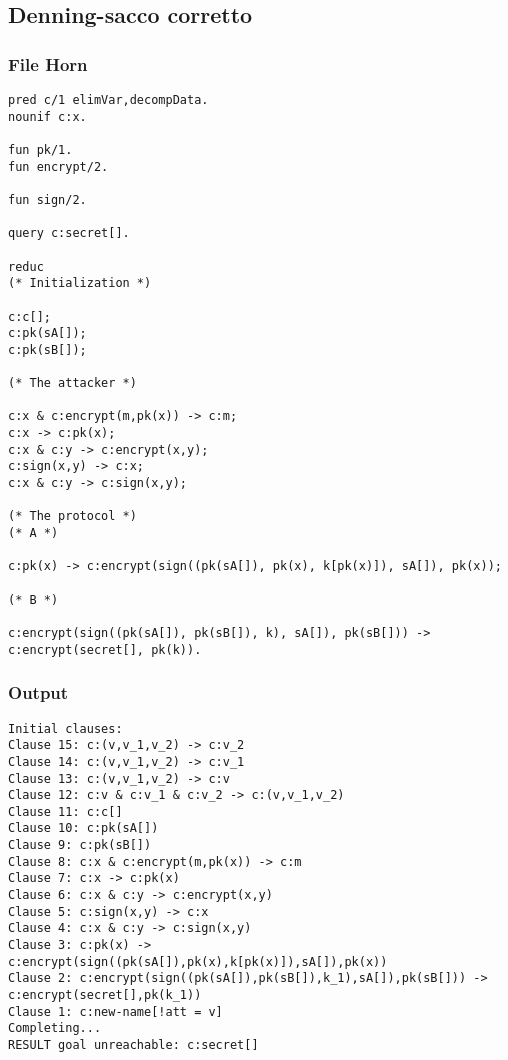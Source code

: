 \documentclass[11pt]{article}
\begin{document}
\subsection{Denning-sacco corretto}
\label{sec:orgd4e2c4a}
\subsubsection{File Horn}
\label{sec:org86ecd58}
\begin{verbatim}
pred c/1 elimVar,decompData.
nounif c:x.

fun pk/1.
fun encrypt/2.

fun sign/2.

query c:secret[].

reduc
(* Initialization *)

c:c[];
c:pk(sA[]);
c:pk(sB[]);

(* The attacker *)

c:x & c:encrypt(m,pk(x)) -> c:m;
c:x -> c:pk(x);
c:x & c:y -> c:encrypt(x,y);
c:sign(x,y) -> c:x;
c:x & c:y -> c:sign(x,y);

(* The protocol *)
(* A *)

c:pk(x) -> c:encrypt(sign((pk(sA[]), pk(x), k[pk(x)]), sA[]), pk(x));

(* B *)

c:encrypt(sign((pk(sA[]), pk(sB[]), k), sA[]), pk(sB[])) -> c:encrypt(secret[], pk(k)).
\end{verbatim}
\subsubsection{Output}
\label{sec:orga1a464d}
\begin{verbatim}
Initial clauses:
Clause 15: c:(v,v_1,v_2) -> c:v_2
Clause 14: c:(v,v_1,v_2) -> c:v_1
Clause 13: c:(v,v_1,v_2) -> c:v
Clause 12: c:v & c:v_1 & c:v_2 -> c:(v,v_1,v_2)
Clause 11: c:c[]
Clause 10: c:pk(sA[])
Clause 9: c:pk(sB[])
Clause 8: c:x & c:encrypt(m,pk(x)) -> c:m
Clause 7: c:x -> c:pk(x)
Clause 6: c:x & c:y -> c:encrypt(x,y)
Clause 5: c:sign(x,y) -> c:x
Clause 4: c:x & c:y -> c:sign(x,y)
Clause 3: c:pk(x) -> c:encrypt(sign((pk(sA[]),pk(x),k[pk(x)]),sA[]),pk(x))
Clause 2: c:encrypt(sign((pk(sA[]),pk(sB[]),k_1),sA[]),pk(sB[])) -> c:encrypt(secret[],pk(k_1))
Clause 1: c:new-name[!att = v]
Completing...
RESULT goal unreachable: c:secret[]
\end{verbatim}
\end{document}
